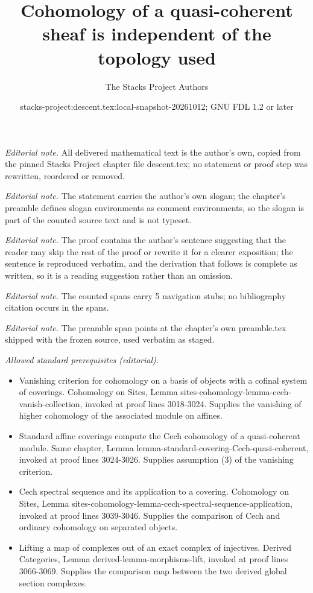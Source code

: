 \documentclass{stacks-project}
\title{Cohomology of a quasi-coherent sheaf is independent of the topology used}
\author{The Stacks Project Authors}
\date{stacks-project:descent.tex:local-snapshot-20261012; GNU FDL 1.2 or later}
\theoremstyle{plain}
\theoremstyle{definition}
\theoremstyle{remark}
\numberwithin{equation}{subsection}
\begin{document}
\maketitle
\noindent\textit{Editorial note.} All delivered mathematical text is the author's own, copied from the pinned Stacks Project chapter file descent.tex; no statement or proof step was rewritten, reordered or removed.\par\medskip
\noindent\textit{Editorial note.} The statement carries the author's own slogan; the chapter's preamble defines slogan environments as comment environments, so the slogan is part of the counted source text and is not typeset.\par\medskip
\noindent\textit{Editorial note.} The proof contains the author's sentence suggesting that the reader may skip the rest of the proof or rewrite it for a clearer exposition; the sentence is reproduced verbatim, and the derivation that follows is complete as written, so it is a reading suggestion rather than an omission.\par\medskip
\noindent\textit{Editorial note.} The counted spans carry 5 navigation stubs; no bibliography citation occurs in the spans.\par\medskip
\noindent\textit{Editorial note.} The preamble span points at the chapter's own preamble.tex shipped with the frozen source, used verbatim as staged.\par\medskip
\noindent\textit{Allowed standard prerequisites (editorial).}\begin{itemize}
\item Vanishing criterion for cohomology on a basis of objects with a cofinal system of coverings. Cohomology on Sites, Lemma sites-cohomology-lemma-cech-vanish-collection, invoked at proof lines 3018-3024. Supplies the vanishing of higher cohomology of the associated module on affines.
\item Standard affine coverings compute the Cech cohomology of a quasi-coherent module. Same chapter, Lemma lemma-standard-covering-Cech-quasi-coherent, invoked at proof lines 3024-3026. Supplies assumption (3) of the vanishing criterion.
\item Cech spectral sequence and its application to a covering. Cohomology on Sites, Lemma sites-cohomology-lemma-cech-spectral-sequence-application, invoked at proof lines 3039-3046. Supplies the comparison of Cech and ordinary cohomology on separated objects.
\item Lifting a map of complexes out of an exact complex of injectives. Derived Categories, Lemma derived-lemma-morphisms-lift, invoked at proof lines 3066-3069. Supplies the comparison map between the two derived global section complexes.
\end{itemize}\medskip
\end{document}
